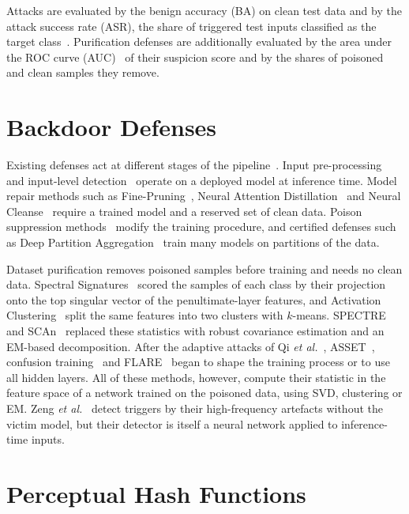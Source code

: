 Attacks are evaluated by the benign accuracy (BA) on clean test data and by the
attack success rate (ASR), the share of triggered test inputs classified as the
target class~\cite{li2024backdoorsurvey}. Purification defenses are additionally
evaluated by the area under the ROC curve (AUC)~\cite{fawcett2006roc} of their
suspicion score and by the shares of poisoned and clean samples they remove.

\section{Backdoor Defenses}
\label{sec:lr-defenses}

Existing defenses act at different stages of the pipeline~\cite{li2024backdoorsurvey,li2023backdoorbox}.
Input pre-processing~\cite{liu2017neuraltrojans,li2021shrinkpad} and input-level
detection~\cite{gao2019strip,guo2023scaleup,hou2024ibdpsc} operate on a deployed
model at inference time. Model repair methods such as
Fine-Pruning~\cite{liu2018fineprune}, Neural Attention
Distillation~\cite{li2021nad} and Neural Cleanse~\cite{wang2019neuralcleanse}
require a trained model and a reserved set of clean data. Poison suppression
methods~\cite{li2021abl,huang2022dbd} modify the training procedure, and
certified defenses such as Deep Partition Aggregation~\cite{levine2021dpa} train
many models on partitions of the data.

Dataset purification removes poisoned samples before training and needs no
clean data. Spectral Signatures~\cite{tran2018spectral} scored the
samples of each class by their projection onto the top singular vector of the
penultimate-layer features, and Activation Clustering~\cite{chen2019activation}
split the same features into two clusters with $k$-means.
SPECTRE~\cite{hayase2021spectre} and SCAn~\cite{tang2021scan} replaced these
statistics with robust covariance estimation and an EM-based decomposition.
After the adaptive attacks of Qi \emph{et al.}~\cite{qi2023revisiting},
ASSET~\cite{pan2023asset}, confusion training~\cite{qi2023proactive} and
FLARE~\cite{hou2025flare} began to shape the training process or to use all
hidden layers. All of these methods, however, compute their statistic in the
feature space of a network trained on the poisoned data, using SVD, clustering
or EM. Zeng \emph{et al.}~\cite{zeng2021frequency} detect triggers by their
high-frequency artefacts without the victim model, but their detector is itself
a neural network applied to inference-time inputs.

\section{Perceptual Hash Functions}
\label{sec:lr-phash}

